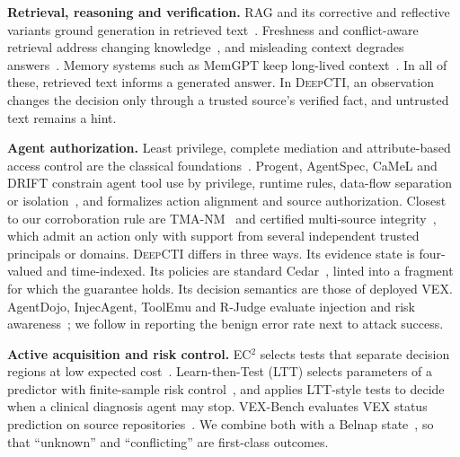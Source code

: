 \documentclass[conference]{IEEEtran}
\newcommand{\DC}{\textsc{DeepCTI}}
\begin{document}
\textbf{Retrieval, reasoning and verification.} RAG and its corrective and reflective variants ground
generation in retrieved text~\cite{lewis2020rag,asai2024selfrag,yan2024crag,he2024covrag}. Freshness and
conflict-aware retrieval address changing
knowledge~\cite{vu2024freshllms,ozer2025temporalconflict,nie2026evotrustrag}, and misleading context
degrades answers~\cite{hong2024gullible}. Memory systems such as MemGPT keep long-lived
context~\cite{packer2023memgpt}. In all of these, retrieved text informs a generated answer. In \DC{}, an
observation changes the decision only through a trusted source's verified fact, and untrusted text
remains a hint.

\textbf{Agent authorization.} Least privilege, complete mediation and attribute-based access control are
the classical
foundations~\cite{saltzer1975protection,hu2014abac,hu2019attributes}. Progent, AgentSpec, CaMeL and
DRIFT constrain agent tool use by privilege, runtime rules, data-flow separation or
isolation~\cite{shi2025progent,wang2026agentspec,debenedetti2025camel,li2025drift}, and
\cite{siu2026agentsecurity} formalizes action alignment and source authorization. Closest to our
corroboration rule are TMA-NM~\cite{louck2026tmanm} and certified multi-source
integrity~\cite{pandey2026certified}, which admit an action only with support from several independent
trusted principals or domains. \DC{} differs in three ways. Its evidence state is four-valued and
time-indexed. Its policies are standard Cedar~\cite{cutler2024cedar}, linted into a fragment for which the
guarantee holds. Its decision semantics are those of deployed VEX. AgentDojo, InjecAgent, ToolEmu and
R-Judge evaluate injection and risk
awareness~\cite{debenedetti2024agentdojo,zhan2024injecagent,ruan2024toolemu,yuan2024rjudge}; we follow
\cite{bhagwatkar2025injectionbenchmarks} in reporting the benign error rate next to attack success.

\textbf{Active acquisition and risk control.} EC$^2$ selects tests that separate decision regions at low
expected cost~\cite{golovin2010ec2,golovin2011adaptive}. Learn-then-Test (LTT) selects parameters of a
predictor with finite-sample risk control~\cite{angelopoulos2021ltt}, and \cite{wu2026safetostop} applies
LTT-style tests to decide when a clinical diagnosis agent may stop. VEX-Bench evaluates VEX status
prediction on source repositories~\cite{vexbench2026}. We combine both with a Belnap
state~\cite{belnap1977useful}, so that ``unknown'' and ``conflicting'' are first-class outcomes.

\end{document}
